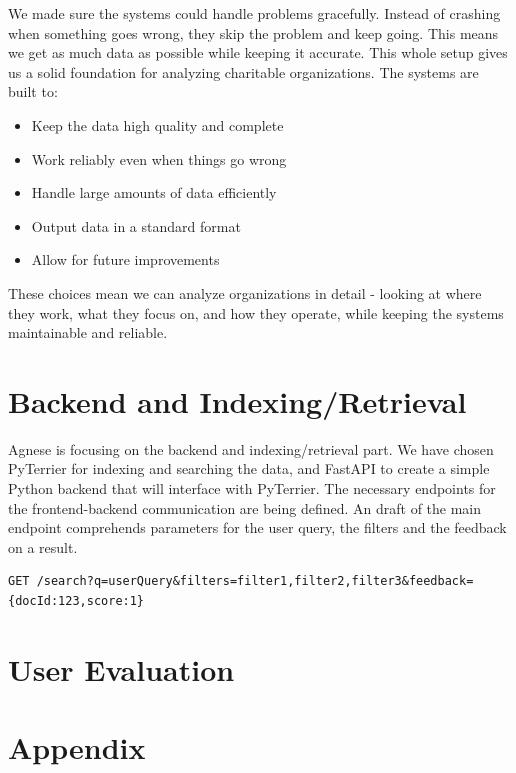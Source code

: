 \documentclass[unicode,9pt,a4paper,oneside,numbers=endperiod,openany]{scrartcl}
\begin{document}
We made sure the systems could handle problems gracefully. Instead of crashing when something goes wrong, they skip the problem and keep going. This means we get as much data as possible while keeping it accurate.
This whole setup gives us a solid foundation for analyzing charitable organizations. The systems are built to:

\begin{itemize}
    \item Keep the data high quality and complete
    \item Work reliably even when things go wrong
    \item Handle large amounts of data efficiently
    \item Output data in a standard format
    \item Allow for future improvements
\end{itemize}

These choices mean we can analyze organizations in detail - looking at where they work, what they focus on, and how they operate, while keeping the systems maintainable and reliable.

\section{Backend and Indexing/Retrieval}
Agnese is focusing on the backend and indexing/retrieval part.
We have chosen PyTerrier for indexing and searching the data, and FastAPI to create a simple Python backend that will interface with PyTerrier.
The necessary endpoints for the frontend-backend communication are being defined.
An draft of the main endpoint comprehends parameters for the user query, the filters and the feedback on a result.
\begin{verbatim}
GET /search?q=userQuery&filters=filter1,filter2,filter3&feedback={docId:123,score:1}
\end{verbatim}

\section{User Evaluation}

\section{Appendix}
\end{document}
